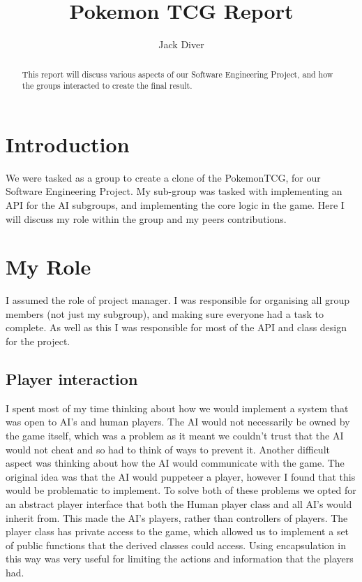 \documentclass[a4paper]{article}
\title{Pokemon TCG Report}
\author{Jack Diver}
\begin{document}
\maketitle

\begin{abstract}
This report will discuss various aspects of our Software Engineering Project, and how the groups interacted to create the final result.
\end{abstract}

\section{Introduction}

We were tasked as a group to create a clone of the PokemonTCG, for our Software Engineering Project. My sub-group was tasked with implementing an API for the AI subgroups, and implementing the core logic in the game. Here I will discuss my role within the group and my peers contributions.

\section{My Role}

I assumed the role of project manager. I was responsible for organising all group members (not just my subgroup), and making sure everyone had a task to complete. As well as this I was responsible for most of the API and class design for the project.

\subsection{Player interaction}
I spent most of my time thinking about how we would implement a system that was open to AI's and human players. The AI would not necessarily be owned by the game itself, which  was a problem as it meant we couldn't trust that the AI would not cheat and so had to think of ways to prevent it. Another difficult aspect was thinking about how the AI would communicate with the game. The original idea was that the AI would puppeteer a player, however I found that this would be problematic to implement. To solve both of these problems we opted for an abstract player interface that both the Human player class and all AI's would inherit from. This made the AI's players, rather than controllers of players. The player class has private access to the game, which allowed us to implement a set of public functions that the derived classes could access. Using encapsulation in this way was very useful for limiting the actions and information that the players had.
\end{document}
